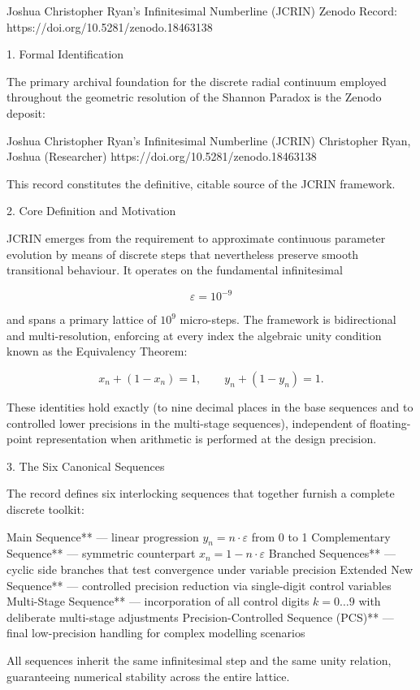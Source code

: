 Joshua Christopher Ryan’s Infinitesimal Numberline (JCRIN)  
Zenodo Record: https://doi.org/10.5281/zenodo.18463138

1. Formal Identification

The primary archival foundation for the discrete radial continuum employed throughout the geometric resolution of the Shannon Paradox is the Zenodo deposit:

Joshua Christopher Ryan’s Infinitesimal Numberline (JCRIN)  
Christopher Ryan, Joshua (Researcher)  
https://doi.org/10.5281/zenodo.18463138

This record constitutes the definitive, citable source of the JCRIN framework.

2. Core Definition and Motivation

JCRIN emerges from the requirement to approximate continuous parameter evolution by means of discrete steps that nevertheless preserve smooth transitional behaviour. It operates on the fundamental infinitesimal

\[
\varepsilon = 10^{-9}
\]

and spans a primary lattice of \(10^9\) micro-steps. The framework is bidirectional and multi-resolution, enforcing at every index the algebraic unity condition known as the Equivalency Theorem:

\[
x_n + (1 - x_n) = 1, \qquad y_n + (1 - y_n) = 1.
\]

These identities hold exactly (to nine decimal places in the base sequences and to controlled lower precisions in the multi-stage sequences), independent of floating-point representation when arithmetic is performed at the design precision.

3. The Six Canonical Sequences

The record defines six interlocking sequences that together furnish a complete discrete toolkit:

Main Sequence** — linear progression \(y_n = n\cdot\varepsilon\) from 0 to 1  
Complementary Sequence** — symmetric counterpart \(x_n = 1 - n\cdot\varepsilon\)  
Branched Sequences** — cyclic side branches that test convergence under variable precision  
Extended New Sequence** — controlled precision reduction via single-digit control variables  
Multi-Stage Sequence** — incorporation of all control digits \(k = 0\dots 9\) with deliberate multi-stage adjustments  
Precision-Controlled Sequence (PCS)** — final low-precision handling for complex modelling scenarios

All sequences inherit the same infinitesimal step and the same unity relation, guaranteeing numerical stability across the entire lattice.

